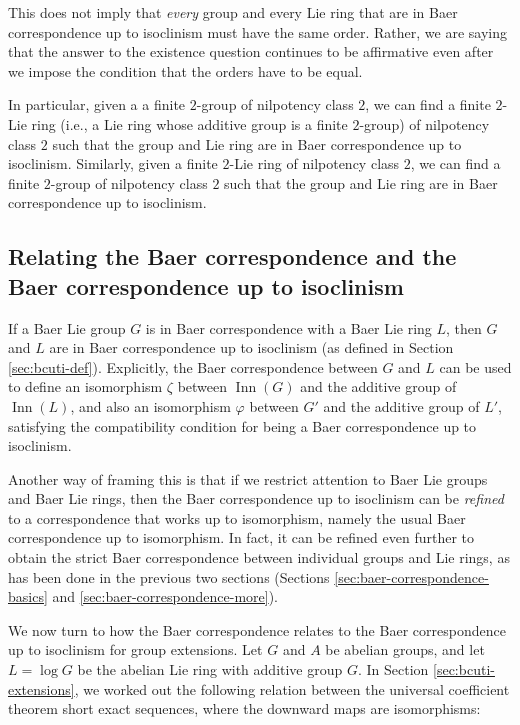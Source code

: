 This does not imply that {\em every} group and every Lie ring that are
in Baer correspondence up to isoclinism must have the same
order. Rather, we are saying that the answer to the existence question
continues to be affirmative even after we impose the condition that
the orders have to be equal.

In particular, given a a finite $2$-group of nilpotency class $2$, we
can find a finite $2$-Lie ring (i.e., a Lie ring whose additive group
is a finite $2$-group) of nilpotency class $2$ such that the group and
Lie ring are in Baer correspondence up to
isoclinism. Similarly, given a finite $2$-Lie ring of nilpotency class
$2$, we can find a finite $2$-group of nilpotency class $2$ such that
the group and Lie ring are in Baer correspondence up to isoclinism.


\subsection{Relating the Baer correspondence and the Baer correspondence up to isoclinism}\label{sec:bc-and-bcuti}

If a Baer Lie group $G$ is in Baer correspondence with a Baer Lie ring
$L$, then $G$ and $L$ are in Baer correspondence up to isoclinism (as
defined in Section \ref{sec:bcuti-def}). Explicitly, the Baer
correspondence between $G$ and $L$ can be used to define an
isomorphism $\zeta$ between $\operatorname{Inn}(G)$ and the additive
group of $\operatorname{Inn}(L)$, and also an isomorphism $\varphi$
between $G'$ and the additive group of $L'$, satisfying the
compatibility condition for being a Baer correspondence up to isoclinism.

Another way of framing this is that if we restrict attention to Baer
Lie groups and Baer Lie rings, then the Baer correspondence up to
isoclinism can be {\em refined} to a correspondence that works up to
isomorphism, namely the usual Baer correspondence up to
isomorphism. In fact, it can be refined even further to obtain the
strict Baer correspondence between individual groups and Lie rings, as
has been done in the previous two sections (Sections
\ref{sec:baer-correspondence-basics} and
\ref{sec:baer-correspondence-more}).

We now turn to how the Baer correspondence relates to the Baer
correspondence up to isoclinism for group extensions. Let $G$ and $A$
be abelian groups, and let $L = \log G$ be the abelian Lie ring with
additive group $G$. In Section \ref{sec:bcuti-extensions}, we worked
out the following relation between the universal coefficient theorem
short exact sequences, where the downward maps are isomorphisms:

